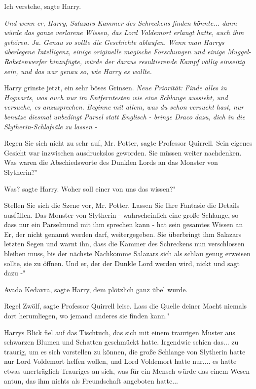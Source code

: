 \glqq{}Ich verstehe\grqq{}, sagte Harry.

\emph{Und wenn er, Harry, Salazars Kammer des Schreckens finden könnte... dann
würde das ganze verlorene Wissen, das Lord Voldemort erlangt hatte, auch ihm
gehören. Ja. Genau so sollte die Geschichte ablaufen. Wenn man Harrys überlegene
Intelligenz, einige originelle magische Forschungen und einige
Muggel-Raketenwerfer hinzufügte, würde der daraus resultierende Kampf völlig
einseitig sein, und das war genau so, wie Harry es wollte.}

Harry grinste jetzt, ein sehr böses Grinsen.
\emph{Neue Priorität: Finde alles in Hogwarts, was auch nur im Entferntesten wie
eine Schlange aussieht, und versuche, es anzusprechen. Beginne mit allem, was
du schon versucht hast, nur benutze diesmal unbedingt Parsel statt Englisch -
bringe Draco dazu, dich in die Slytherin-Schlafsäle zu lassen -}

\glqq{}Regen Sie sich nicht zu sehr auf, Mr. Potter\grqq{}, sagte Professor
Quirrell. Sein eigenes Gesicht war inzwischen ausdruckslos geworden. \glqq{}Sie
müssen weiter nachdenken. Was waren die Abschiedsworte des Dunklen Lords an das
Monster von Slytherin?"

\glqq{}Was?\grqq{} sagte Harry. \glqq{}Woher soll einer von uns das wissen?"

\glqq{}Stellen Sie sich die Szene vor, Mr. Potter. Lassen Sie Ihre Fantasie die
Details ausfüllen. Das Monster von Slytherin - wahrscheinlich eine große
Schlange, so dass nur ein Parselmund mit ihm sprechen kann - hat sein gesamtes
Wissen an Er, der nicht genannt werden darf, weitergegeben. Sie überbringt ihm
Salazars letzten Segen und warnt ihn, dass die Kammer des Schreckens nun
verschlossen bleiben muss, bis der nächste Nachkomme Salazars sich als schlau
genug erweisen sollte, sie zu öffnen. Und er, der der Dunkle Lord werden wird,
nickt und sagt dazu -"

\glqq{}Avada Kedavra\grqq{}, sagte Harry, dem plötzlich ganz übel wurde.

\glqq{}Regel Zwölf\grqq{}, sagte Professor Quirrell leise. \glqq{}Lass die Quelle
deiner Macht niemals dort herumliegen, wo jemand anderes sie finden kann."

Harrys Blick fiel auf das Tischtuch, das sich mit einem traurigen Muster aus
schwarzen Blumen und Schatten geschmückt hatte. Irgendwie schien das... zu
traurig, um es sich vorstellen zu können, die große Schlange von Slytherin hatte
nur Lord Voldemort helfen wollen, und Lord Voldemort hatte nur.... es hatte
etwas unerträglich Trauriges an sich, was für ein Mensch würde das einem Wesen
antun, das ihm nichts als Freundschaft angeboten hatte...

